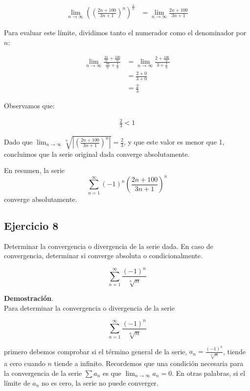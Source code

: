 \documentclass{article}
\begin{document}
    \begin{align*}
    \lim_{n \rightarrow \infty}\left(\left(\frac{2 n+100}{3 n+1}\right)^{n}\right)^{\frac{1}{n}} &= \lim_{n \rightarrow \infty} \frac{2 n+100}{3 n+1}
    \end{align*}

    Para evaluar este límite, dividimos tanto el numerador como el denominador por \(n\):

    \begin{align*}
    \lim_{n \rightarrow \infty} \frac{\frac{2 n}{n}+\frac{100}{n}}{\frac{3 n}{n}+\frac{1}{n}} &= \lim_{n \rightarrow \infty} \frac{2+\frac{100}{n}}{3+\frac{1}{n}} \\
    &= \frac{2+0}{3+0} \\
    &= \frac{2}{3}
    \end{align*}

    Observamos que:

    \begin{align*}
    \frac{2}{3} < 1
    \end{align*}

    Dado que \(\lim_{n \to \infty} \sqrt[n]{\left|\left(\frac{2 n + 100}{3 n + 1}\right)^n\right|} = \frac{2}{3}\), y que este valor es menor que 1, concluimos que la serie original dada converge absolutamente.

    En resumen, la serie
    $$
    \sum_{n=1}^{\infty}(-1)^{n}\left(\frac{2 n+100}{3 n+1}\right)^{n}
    $$
    converge absolutamente.

    \subsection*{Ejercicio 8}

    Determinar la convergencia o divergencia de la serie dada. En caso de convergencia, determinar si converge absoluta o condicionalmente.

    $$
    \sum_{n=1}^{\infty} \frac{(-1)^{n}}{\sqrt[n]{n}}
    $$

    \textbf{Demostración}.\\

    Para determinar la convergencia o divergencia de la serie

    $$
    \sum_{n=1}^{\infty} \frac{(-1)^{n}}{\sqrt[n]{n}}
    $$

    primero debemos comprobar si el término general de la serie, \( a_n = \frac{(-1)^{n}}{\sqrt[n]{n}} \), tiende a cero cuando \( n \) tiende a infinito. Recordemos que una condición necesaria para la convergencia de la serie \( \sum a_n \) es que \( \lim_{n \rightarrow \infty} a_n = 0 \). En otras palabras, si el límite de \( a_n \) no es cero, la serie no puede converger.
\end{document}
